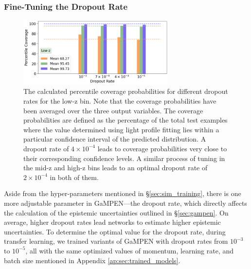 \documentclass[linenumbers,twocolumn,twocolappendix]{aastex631}
\newcommand\gampen{GaMPEN}
\begin{document}
\begin{CJK*}{UTF8}{gbsn}
\subsubsection{Fine-Tuning the Dropout Rate} \label{sec:fine_tuning_dropout}

\begin{figure}[htb]
    \centering
    \includegraphics[width = 0.7\textwidth]{dropout_calibration.png}
    \caption{The calculated percentile coverage probabilities for different dropout rates for the low-z bin. Note that the coverage probabilities have been averaged over the three output variables. The coverage probabilities are defined as the percentage of the total test examples where the value determined using light profile fitting lies  within  a  particular confidence interval of the predicted distribution. A dropout rate of $4\times10^{-4}$ leads to coverage probabilities very close to their corresponding confidence levels. A similar process of tuning in the mid-z and high-z bins leads to an optimal dropout rate of $2\times10^{-4}$ in both of them.}
    \label{fig:dropout_calibration}
\end{figure}

Aside from the hyper-parameters mentioned in \S \ref{sec:sim_training}, there is one more adjustable parameter in \gampen{}---the dropout rate, which directly affects the calculation of the epistemic uncertainties outlined in \S \ref{sec:gampen}. On average, higher dropout rates lead networks to estimate higher epistemic uncertainties. To determine the optimal value for the dropout rate, during transfer learning, we trained variants of \gampen{} with dropout rates from $10^{-3}$ to $10^{-5}$, all with the same optimized values of momentum, learning rate, and batch size mentioned in Appendix \ref{ap:sec:trained_models}.


\end{CJK*}
\end{document}
